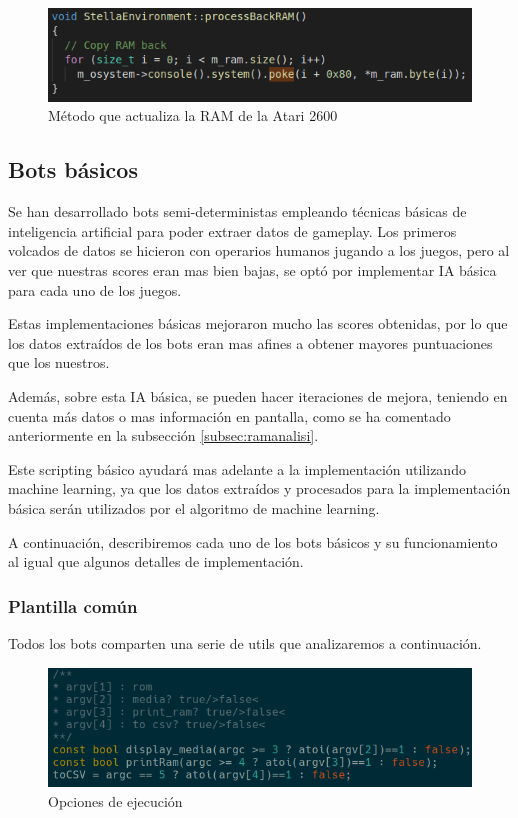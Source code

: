 \begin{figure}[h]
	\centering
	\includegraphics[width=1\textwidth]{Figures/processBackRAM}
	\caption{Método que actualiza la RAM de la Atari 2600}
	\label{fig:processBackRAM}
\end{figure}

\newpage
\subsection{Bots básicos}
\label{subsec:botsbasicos}
Se han desarrollado bots semi-deterministas empleando técnicas básicas de inteligencia artificial para poder extraer datos de gameplay. Los primeros volcados de datos se hicieron con operarios humanos jugando a los juegos, pero al ver que nuestras scores eran mas bien bajas, se optó por implementar IA básica para cada uno de los juegos. 

Estas implementaciones básicas mejoraron mucho las scores obtenidas, por lo que los datos extraídos de los bots eran mas afines a obtener mayores puntuaciones que los nuestros.

Además, sobre esta IA básica, se pueden hacer iteraciones de mejora, teniendo en cuenta más datos o mas información en pantalla, como se ha comentado anteriormente en la subsección \ref{subsec:ramanalisi}.

Este scripting básico ayudará mas adelante a la implementación utilizando machine learning, ya que los datos extraídos y procesados para la implementación básica serán utilizados por el algoritmo de machine learning.

A continuación, describiremos cada uno de los bots básicos y su funcionamiento al igual que algunos detalles de implementación.

\subsubsection{Plantilla común}
\label{subsec:botsbasicos:plantcomun}
Todos los bots comparten una serie de utils que analizaremos a continuación.

\begin{figure}[h]
	\centering
	\includegraphics[width=1\textwidth]{Figures/ALEMediaSettings}
	\caption{Opciones de ejecución}
	\label{fig:ALEMediaSettings}
\end{figure}

